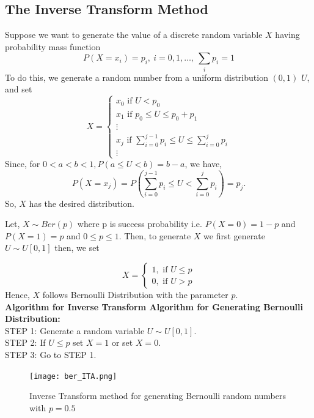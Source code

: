 \subsection{The Inverse Transform Method}
Suppose we want to generate the value of a discrete random variable $X$ having probability mass function
\[
	P(X=x_i)=p_i, \ i = 0,1, \ldots , \ \sum_ip_i =1
\]
To do this, we generate a random number from a uniform distribution $(0,1)$ $U$, and set
\[
	X=
	\begin{cases}
		x_0 \text{ if } U<p_0                                         \\
		x_1 \text{ if } p_0\le U\le p_0+p_1                           \\
		\vdots                                                        \\
		x_j \text{ if } \sum_{i=0}^{j-1}p_i\le U\le \sum_{i=0}^{j}p_i \\
		\vdots
	\end{cases}
\]
Since, for $0<a<b<1, P(a\le U<b) = b-a$, we have,
\[
	P(X=x_j)=P\left( \sum_{i=0}^{j-1}p_i\le U< \sum_{i=0}^{j}p_i \right) = p_j
	.\]
So, $X$ has the desired distribution.

\begin{example}
	Let, $X\sim Ber(p)$ where p is success probability  i.e.  $P(X=0)= 1-p$ and  $P(X=1)=p$ and $0\le p \le 1$.
	Then, to generate $X$ we first generate $U \sim U[0,1]$ then, we set

	\[
		X=
		\begin{cases}
			1, \text{ if } U\le p \\
			0, \text{ if } U> p
		\end{cases}
	\]
	Hence, $X$ follows Bernoulli Distribution with the parameter $p$.\\
	\textbf{Algorithm for Inverse Transform Algorithm for Generating Bernoulli Distribution:}\\
	STEP 1: Generate a random variable $U\sim U[0,1]$.\\
	STEP 2: If $U\le p$ set $X=1$ or set  $X=0$. \\
	STEP 3: Go to  STEP 1.

	\begin{figure}[H]
		\centering
		\texttt{[image: ber\_ITA.png]}
		\caption{Inverse Transform method for generating  Bernoulli random numbers with $p=0.5$}
	\end{figure}
\end{example}

